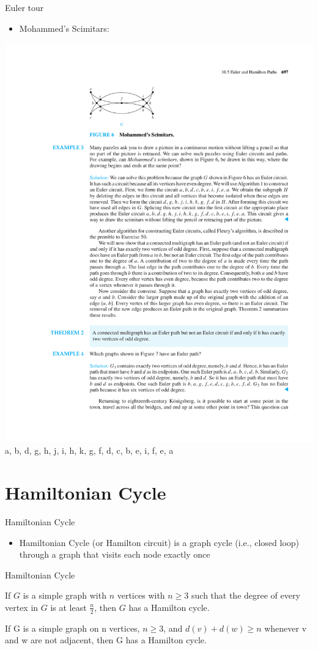 \documentclass{beamer}
\theoremstyle{definition}
\begin{document}
\begin{frame}{Euler tour}
   \begin{itemize}
        \item Mohammed's Scimitars:
    \end{itemize}
    \centering \includegraphics[trim={5cm 22.5cm 10cm 2.5cm},clip,width=.75\linewidth]{p697}
    \\a, b, d, g, h, j, i, h, k, g, f, d, c, b, e, i, f, e, a
\end{frame}

\section{Hamiltonian Cycle}

\begin{frame}{Hamiltonian Cycle}
   \begin{itemize}
        \item Hamiltonian Cycle (or Hamilton circuit) is a graph cycle (i.e., closed loop) through a graph that visits each node exactly once 
    \end{itemize}
\end{frame}

\begin{frame}{Hamiltonian Cycle}
    \begin{theorem}\label{theo:dirac}
        If $G$ is a simple graph with $n$ vertices with $n\geq 3$ such that the degree of every vertex in $G$ is at least $\frac{n}{2}$, then $G$ has a Hamilton cycle. 
    \end{theorem}
    \begin{theorem}\label{theo:ore}
        If G is a simple graph on n vertices, $n\geq 3$, and $d(v)+d(w)\geq n$ whenever v and w are not adjacent, then G has a Hamilton cycle. 
    \end{theorem}
\end{frame}
\end{document}
